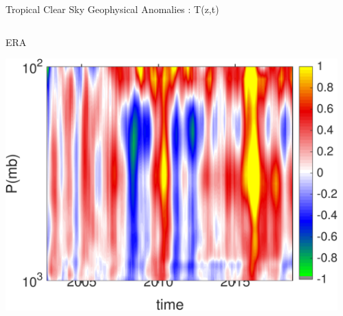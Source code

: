 \documentclass[10pt,t]{beamer}
\begin{document}
\begin{frame}{Tropical Clear Sky Geophysical Anomalies : T(z,t)}
\vspace{-0.35in}

\begin{columns}
\begin{column}{0.45\columnwidth}
\begin{block}{\footnotesize ERA}
\vspace{-0.1in}
\begin{center}
\includegraphics[width=\linewidth]{Figs/ClearAnom/era_clr_ptemp_anom_200209_201808.png}
\end{center}
\end{block}
\end{column}

\begin{column}{0.45\columnwidth}
\end{column}
\end{columns}

\vspace{-0.25in}


\end{frame}
\end{document}
